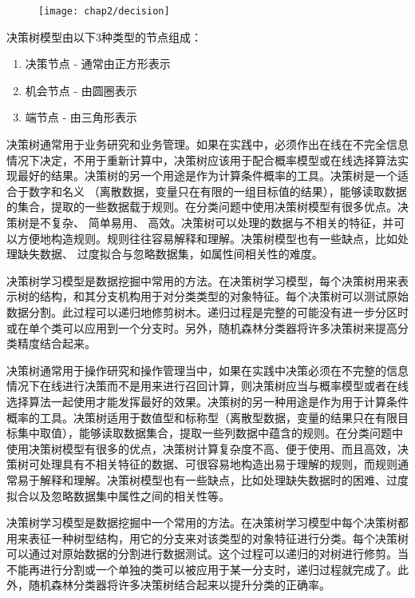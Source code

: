 \begin{figure}[!htp]
    \centering
    \texttt{[image: chap2/decision]}
\end{figure}

决策树模型由以下3种类型的节点组成：
\begin{enumerate}
    \item 决策节点 - 通常由正方形表示
    \item 机会节点 - 由圆圈表示
    \item 端节点 - 由三角形表示
\end{enumerate}


决策树通常用于业务研究和业务管理。如果在实践中，必须作出在线在不完全信息情况下决定，不用于重新计算中，决策树应该用于配合概率模型或在线选择算法实现最好的结果。决策树的另一个用途是作为计算条件概率的工具。决策树是一个适合于数字和名义 （离散数据，变量只在有限的一组目标值的结果），能够读取数据的集合，提取的一些数据载于规则。在分类问题中使用决策树模型有很多优点。决策树是不复杂、 简单易用、 高效。决策树可以处理的数据与不相关的特征，并可以方便地构造规则。规则往往容易解释和理解。决策树模型也有一些缺点，比如处理缺失数据、 过度拟合与忽略数据集，如属性间相关性的难度。

决策树学习模型是数据挖掘中常用的方法。在决策树学习模型，每个决策树用来表示树的结构，和其分支机构用于对分类类型的对象特征。每个决策树可以测试原始数据分割。此过程可以递归地修剪树木。递归过程是完整的可能没有进一步分区时或在单个类可以应用到一个分支时。另外，随机森林分类器将许多决策树来提高分类精度结合起来。


决策树通常用于操作研究和操作管理当中，如果在实践中决策必须在不完整的信息情况下在线进行决策而不是用来进行召回计算，则决策树应当与概率模型或者在线选择算法一起使用才能发挥最好的效果。决策树的另一种用途是作为用于计算条件概率的工具。决策树适用于数值型和标称型（离散型数据，变量的结果只在有限目标集中取值），能够读取数据集合，提取一些列数据中蕴含的规则。在分类问题中使用决策树模型有很多的优点，决策树计算复杂度不高、便于使用、而且高效，决策树可处理具有不相关特征的数据、可很容易地构造出易于理解的规则，而规则通常易于解释和理解。决策树模型也有一些缺点，比如处理缺失数据时的困难、过度拟合以及忽略数据集中属性之间的相关性等。

决策树学习模型是数据挖掘中一个常用的方法。在决策树学习模型中每个决策树都用来表征一种树型结构，用它的分支来对该类型的对象特征进行分类。每个决策树可以通过对原始数据的分割进行数据测试。这个过程可以递归的对树进行修剪。当不能再进行分割或一个单独的类可以被应用于某一分支时，递归过程就完成了。此外，随机森林分类器将许多决策树结合起来以提升分类的正确率。


